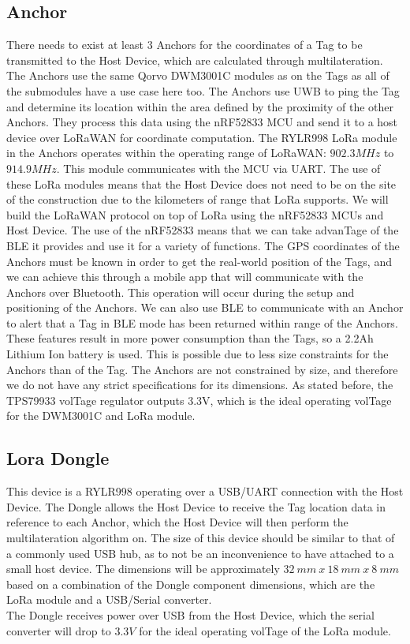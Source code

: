 \documentclass[conference]{IEEEtran}
\begin{document}
\subsection{Anchor}
There needs to exist at least $3$ Anchors for the coordinates of a Tag to be 
transmitted to the Host Device, which are calculated through multilateration. 
The Anchors use the same Qorvo DWM3001C modules as on the Tags as all 
of the submodules have a use case here too. The Anchors use UWB to ping 
the Tag and determine its location within the area defined by the 
proximity of the other Anchors. They process this data using the 
nRF52833 MCU and send it to a host device over LoRaWAN for coordinate computation. 
The RYLR998 LoRa module in the Anchors operates within the operating range of 
LoRaWAN: $902.3 MHz$ to $914.9 MHz$. This module communicates with the MCU 
via UART. The use of these LoRa modules means that the Host Device does 
not need to be on the site of the construction due to the 
kilometers of range that LoRa supports. We will build the LoRaWAN 
protocol on top of LoRa using the nRF52833 MCUs and Host Device. The use of the nRF52833 
means that we can take advanTage of the BLE it provides and use 
it for a variety of functions. The GPS coordinates of the Anchors must 
be known in order to get the real-world position of the Tags, and we can achieve
this through a mobile app that will communicate with the Anchors over Bluetooth. 
This operation will occur during the setup and positioning of the Anchors. We can also
use BLE to communicate with an Anchor to alert that a Tag in 
BLE mode has been returned within range of the Anchors. These features 
result in  more power consumption than the Tags, so a 2.2Ah Lithium Ion 
battery is used. This is possible due to less size constraints for the 
Anchors than of the Tag. The Anchors are not constrained by size, and therefore we 
do not have any strict specifications for its dimensions.
As stated before, the TPS79933 volTage regulator outputs 3.3V, which is 
the ideal operating volTage for the DWM3001C and LoRa module. 


\subsection{Lora Dongle}
This device is a RYLR998 operating over a USB/UART connection with the 
Host Device. The Dongle allows the Host Device to receive the Tag location data in 
reference to each Anchor, which the Host Device will then perform the multilateration algorithm on.
The size of this device should be similar 
to that of a commonly used USB hub, as to not be an inconvenience to have attached to a 
small host device. The dimensions will be approximately $32 \ mm\  x \ 18 \ mm \
x \ 8 \ mm$ based on a combination of the Dongle component dimensions, which are the LoRa 
module and a USB/Serial converter. 
\\ The Dongle receives power over USB from the Host Device, which the serial converter will
drop to $3.3V$ for the ideal operating volTage of the LoRa module.
\end{document}
